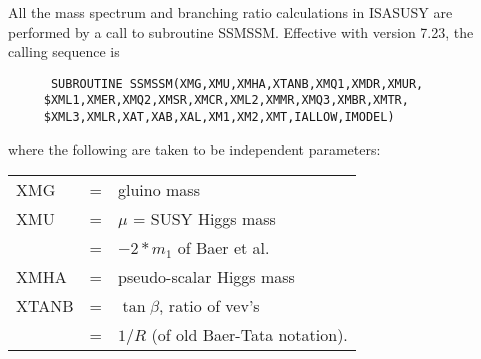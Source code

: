       All the mass spectrum and branching ratio calculations in ISASUSY 
are performed by a call to subroutine SSMSSM. Effective with version 7.23,
the calling sequence is
\begin{verbatim}
      SUBROUTINE SSMSSM(XMG,XMU,XMHA,XTANB,XMQ1,XMDR,XMUR,
     $XML1,XMER,XMQ2,XMSR,XMCR,XML2,XMMR,XMQ3,XMBR,XMTR,
     $XML3,XMLR,XAT,XAB,XAL,XM1,XM2,XMT,IALLOW,IMODEL)
\end{verbatim}
where the following are taken to be independent parameters:

\smallskip\noindent
\begin{tabular}{lcl}
      XMG    &=& gluino mass\\
      XMU    &=& $\mu$ = SUSY Higgs mass\\
             &=& $-2*m_1$ of Baer et al.\\
      XMHA   &=& pseudo-scalar Higgs mass\\
      XTANB  &=& $\tan\beta$, ratio of vev's\\
             &=& $1/R$ (of old Baer-Tata notation).\\
\end{tabular}


